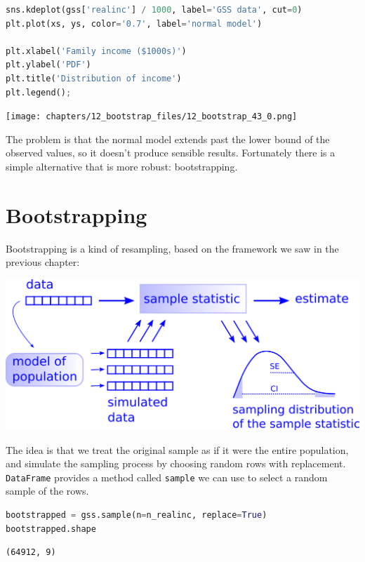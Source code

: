 \begin{lstlisting}[language=Python,style=source]
sns.kdeplot(gss['realinc'] / 1000, label='GSS data', cut=0)
plt.plot(xs, ys, color='0.7', label='normal model')

plt.xlabel('Family income ($1000s)')
plt.ylabel('PDF')
plt.title('Distribution of income')
plt.legend();
\end{lstlisting}

\begin{center}
\texttt{[image: chapters/12\_bootstrap\_files/12\_bootstrap\_43\_0.png]}
\end{center}

The problem is that the normal model extends past the lower bound of the
observed values, so it doesn't produce sensible results. Fortunately
there is a simple alternative that is more robust: bootstrapping.

\hypertarget{bootstrapping}{%
\section{Bootstrapping}\label{bootstrapping}}

Bootstrapping is a kind of resampling, based on the framework we saw in
the previous chapter:

\includegraphics{chapters/figs/resampling.png}

The idea is that we treat the original sample as if it were the entire
population, and simulate the sampling process by choosing random rows
with replacement. \passthrough{\lstinline!DataFrame!} provides a method
called \passthrough{\lstinline!sample!} we can use to select a random
sample of the rows.

\begin{lstlisting}[language=Python,style=source]
bootstrapped = gss.sample(n=n_realinc, replace=True)
bootstrapped.shape
\end{lstlisting}

\begin{lstlisting}[style=output]
(64912, 9)
\end{lstlisting}

